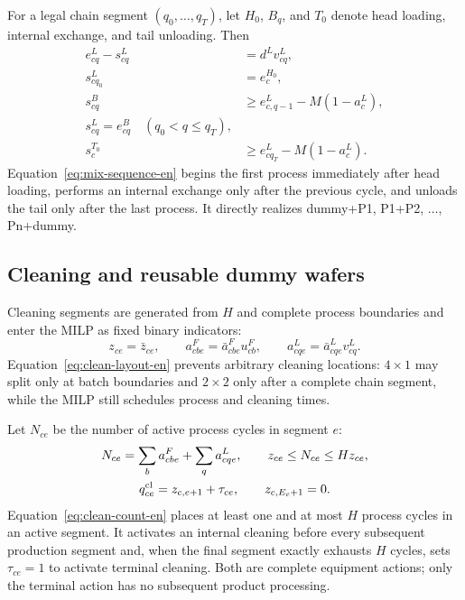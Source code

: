 \documentclass[journal]{IEEEtran}
\begin{document}
For a legal chain segment $(q_0,\ldots,q_T)$, let $H_0$, $B_q$, and $T_0$ denote head loading, internal exchange, and tail unloading. Then
\begin{equation}
\begin{aligned}
e^L_{cq}-s^L_{cq}&=d^L v^L_{cq},\\
s^L_{cq_0}&=e^{H_0}_c,\\
s^{B}_{cq}&\ge e^L_{c,q-1}-M(1-a^L_c),\\
s^L_{cq}=e^{B}_{cq}\quad(q_0<q\le q_T),\\
s^{T_0}_c&\ge e^L_{cq_T}-M(1-a^L_c).
\end{aligned}
\label{eq:mix-sequence-en}
\end{equation}
Equation~\eqref{eq:mix-sequence-en} begins the first process immediately after head loading, performs an internal exchange only after the previous cycle, and unloads the tail only after the last process. It directly realizes dummy+P1, P1+P2, $\ldots$, Pn+dummy.

\subsection{Cleaning and reusable dummy wafers}

Cleaning segments are generated from $H$ and complete process boundaries and enter the MILP as fixed binary indicators:
\begin{equation}
z_{ce}=\bar z_{ce},\qquad
a^F_{cbe}=\bar a^F_{cbe}u^F_{cb},\qquad
a^L_{cqe}=\bar a^L_{cqe}v^L_{cq}.
\label{eq:clean-layout-en}
\end{equation}
Equation~\eqref{eq:clean-layout-en} prevents arbitrary cleaning locations: $4\times1$ may split only at batch boundaries and $2\times2$ only after a complete chain segment, while the MILP still schedules process and cleaning times.

Let $N_{ce}$ be the number of active process cycles in segment $e$:
\begin{equation}
\begin{gathered}
N_{ce}=\sum_b a^F_{cbe}+\sum_q a^L_{cqe},\qquad
z_{ce}\le N_{ce}\le Hz_{ce},\\
q^{\rm cl}_{ce}=z_{c,e+1}+\tau_{ce},\qquad z_{c,E_c+1}=0.
\end{gathered}
\label{eq:clean-count-en}
\end{equation}
Equation~\eqref{eq:clean-count-en} places at least one and at most $H$ process cycles in an active segment. It activates an internal cleaning before every subsequent production segment and, when the final segment exactly exhausts $H$ cycles, sets $\tau_{ce}=1$ to activate terminal cleaning. Both are complete equipment actions; only the terminal action has no subsequent product processing.
\end{document}

